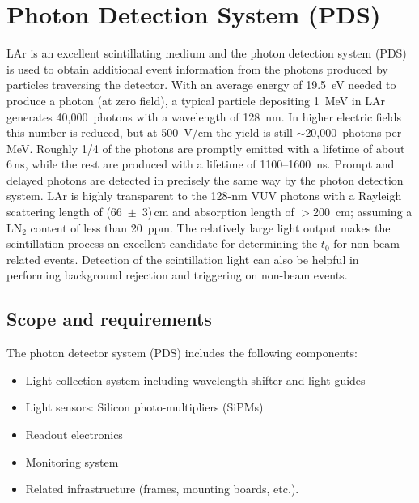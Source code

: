 
\section{Photon Detection System (PDS)}
\label{sec:pd_system}

LAr is an excellent scintillating medium and the photon detection
system (PDS) is used to obtain additional event information from
the photons produced by particles traversing the detector.
 With an
average energy of 19.5~eV needed to produce a photon (at zero field),
a typical particle depositing 1~MeV in LAr generates
40,000~photons with a wavelength of 128~nm. In higher electric fields this number is 
reduced, but at 500~V/cm the yield is still $\sim$20,000~photons
per MeV. Roughly 1/4 of the photons are promptly emitted with a
lifetime of about 6\,ns, while the rest are produced with a lifetime of
1100--1600~ns. Prompt and delayed photons are detected in
  precisely the same way by the photon detection system. LAr is
highly transparent to the 128-nm VUV photons with a Rayleigh
scattering length of (66~$\pm$~3)\,cm %
and absorption
length of $>$200~cm; assuming a LN$_2$
  content of less than 20~ppm. The relatively large light output makes
the scintillation process an excellent candidate for determining the
$t_0$ for non-beam related events. Detection of the scintillation
light can also be helpful in performing background rejection and triggering on
non-beam events.

\subsection{Scope and requirements}

The photon detector system (PDS) 
includes the following components:

\begin{itemize}
\item Light collection system including wavelength shifter and light guides
\item Light sensors: Silicon photo-multipliers (SiPMs)
\item Readout electronics
\item Monitoring system
\item Related infrastructure (frames, mounting boards, etc.).
\end{itemize}


